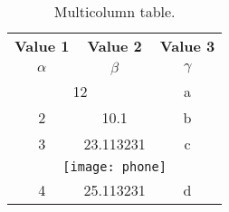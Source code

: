 \documentclass{article}
\begin{document}
	
	\begin{table}[h!]
		\begin{center}
			\caption{Multicolumn table.}
			\label{tab:table1}
			\begin{tabular}{|c|c|c|}
				\hline
				\textbf{Value 1} & \textbf{Value 2} & \textbf{Value 3}\\
				$\alpha$ & $\beta$ & $\gamma$ \\
				\hline
				\multicolumn{2}{|c|}{12} & a\\
				\hline
				2 & 10.1 & b\\
				3 & 23.113231 & c\\
				\hline
				\multicolumn{3}{|c|}{\texttt{[image: phone]}}
				\\
				\hline
				4 & 25.113231 & d\\
				\hline
			\end{tabular}		
			\end{center}
		\end{table}
	
\end{document}
